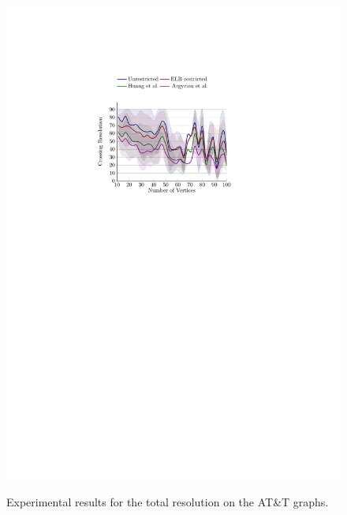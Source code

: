 \documentclass{comjnl}
\begin{document}
\begin{figure}[t!]
{	\includegraphics[scale=0.99,page=12]{figures/north_colored}}
	\caption{Experimental results for the total resolution on the AT\&T graphs.}
	\label{fig:northTotal}
\end{figure}
\end{document}
